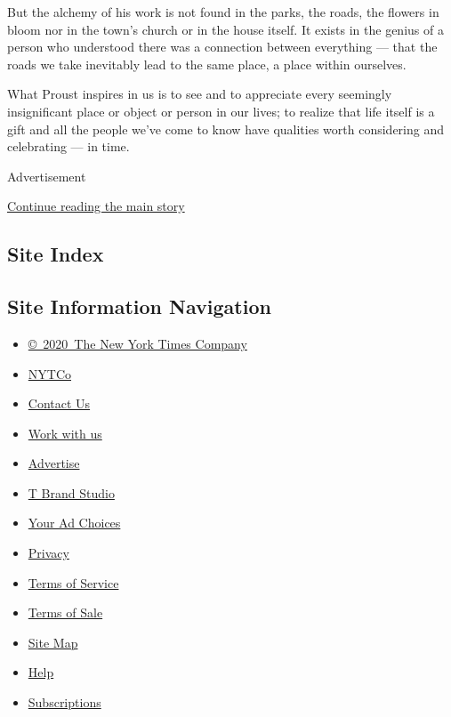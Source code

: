But the alchemy of his work is not found in the parks, the roads, the
flowers in bloom nor in the town's church or in the house itself. It
exists in the genius of a person who understood there was a connection
between everything --- that the roads we take inevitably lead to the
same place, a place within ourselves.

What Proust inspires in us is to see and to appreciate every seemingly
insignificant place or object or person in our lives; to realize that
life itself is a gift and all the people we've come to know have
qualities worth considering and celebrating --- in time.

Advertisement

\protect\hyperlink{after-bottom}{Continue reading the main story}

\hypertarget{site-index}{%
\subsection{Site Index}\label{site-index}}

\hypertarget{site-information-navigation}{%
\subsection{Site Information
Navigation}\label{site-information-navigation}}

\begin{itemize}
\tightlist
\item
  \href{https://help.nytimes3xbfgragh.onion/hc/en-us/articles/115014792127-Copyright-notice}{©~2020~The
  New York Times Company}
\end{itemize}

\begin{itemize}
\tightlist
\item
  \href{https://www.nytco.com/}{NYTCo}
\item
  \href{https://help.nytimes3xbfgragh.onion/hc/en-us/articles/115015385887-Contact-Us}{Contact
  Us}
\item
  \href{https://www.nytco.com/careers/}{Work with us}
\item
  \href{https://nytmediakit.com/}{Advertise}
\item
  \href{http://www.tbrandstudio.com/}{T Brand Studio}
\item
  \href{https://www.nytimes3xbfgragh.onion/privacy/cookie-policy\#how-do-i-manage-trackers}{Your
  Ad Choices}
\item
  \href{https://www.nytimes3xbfgragh.onion/privacy}{Privacy}
\item
  \href{https://help.nytimes3xbfgragh.onion/hc/en-us/articles/115014893428-Terms-of-service}{Terms
  of Service}
\item
  \href{https://help.nytimes3xbfgragh.onion/hc/en-us/articles/115014893968-Terms-of-sale}{Terms
  of Sale}
\item
  \href{https://spiderbites.nytimes3xbfgragh.onion}{Site Map}
\item
  \href{https://help.nytimes3xbfgragh.onion/hc/en-us}{Help}
\item
  \href{https://www.nytimes3xbfgragh.onion/subscription?campaignId=37WXW}{Subscriptions}
\end{itemize}
